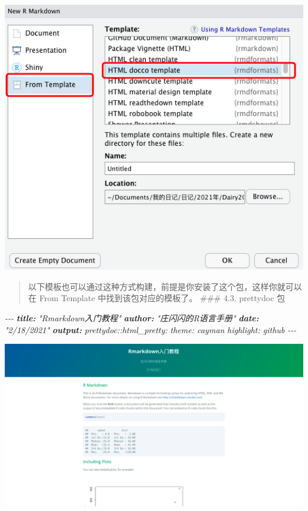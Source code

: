 \documentclass[
]{book}
\newenvironment{Shaded}{\begin{snugshade}}{\end{snugshade}}
\newcommand{\AnnotationTok}[1]{\textcolor[rgb]{0.56,0.35,0.01}{\textbf{\textit{#1}}}}
\newcommand{\CommentTok}[1]{\textcolor[rgb]{0.56,0.35,0.01}{\textit{#1}}}
\begin{document}
\includegraphics{images/paste-E459B436.png}

\begin{quote}
以下模板也可以通过这种方式构建，前提是你安装了这个包，这样你就可以在
From Template 中找到该包对应的模板了。 \#\#\# 4.3. prettydoc 包
\end{quote}

\begin{Shaded}
\begin{Highlighting}[]
\CommentTok{{-}{-}{-}}
\AnnotationTok{title:}\CommentTok{ "Rmarkdown入门教程"}
\AnnotationTok{author:}\CommentTok{ "庄闪闪的R语言手册"}
\AnnotationTok{date:}\CommentTok{ "2/18/2021"}
\AnnotationTok{output:}
\CommentTok{  prettydoc::html\_pretty:}
\CommentTok{    theme: cayman}
\CommentTok{    highlight: github}
\CommentTok{{-}{-}{-}}
\end{Highlighting}
\end{Shaded}

\includegraphics{images/paste-AA57CB6A.png}
\end{document}
